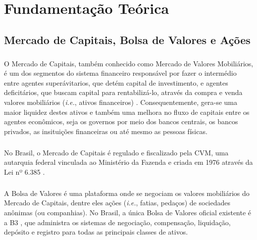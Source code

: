 \chapter{Fundamentação Teórica}
\label{cap2}



\FloatBarrier
\section{Mercado de Capitais, Bolsa de Valores e Ações}

\paragraph{} O Mercado de Capitais, também conhecido como Mercado de Valores Mobiliários, é um dos segmentos do sistema financeiro responsável por fazer o intermédio entre agentes superávitarios, que detém capital de investimento, e agentes deficitários, que buscam capital para rentabilizá-lo, através da compra e venda valores mobiliários (\textit{i.e.}, ativos financeiros) \cite{mercado_de_capitais}. Consequentemente, gera-se uma maior liquidez destes ativos e também uma melhora no fluxo de capitais entre os agentes econômicos, seja os governos por meio dos bancos centrais, os bancos privados, as insituições financeiras ou até mesmo as pessoas físicas.

\paragraph{} No Brasil, o Mercado de Capitais é regulado e fiscalizado pela CVM, uma autarquia federal vinculada ao Ministério da Fazenda e criada em 1976 através da Lei nº 6.385 \cite{lei_6385}.

\paragraph{} A Bolsa de Valores é uma plataforma onde se negociam os valores mobiliários do Mercado de Capitais, dentre eles ações (\textit{i.e.}, fatias, pedaços) de sociedades anônimas (ou companhias). No Brasil, a única Bolsa de Valores oficial existente é a B3 \cite{b3}, que administra os sistemas de negociação, compensação, liquidação, depósito e registro para todas as principais classes de ativos.

